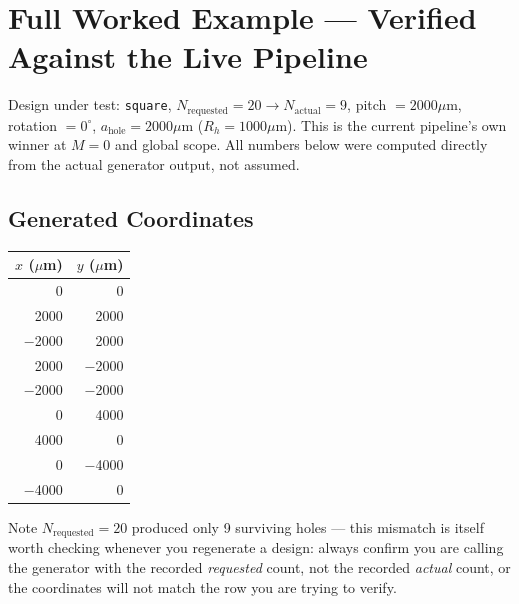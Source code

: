 \section{Full Worked Example --- Verified Against the Live Pipeline}

Design under test: \texttt{square}, $N_{\text{requested}}=20 \to
N_{\text{actual}}=9$, pitch $=2000\mu$m, rotation $=0^\circ$,
$a_{\text{hole}}=2000\mu$m ($R_h=1000\mu$m). This is the current pipeline's
own winner at $M{=}0$ and global scope. All numbers below were computed
directly from the actual generator output, not assumed.

\subsection{Generated Coordinates}
\begin{center}
\begin{tabular}{rr}
\toprule
$x$ ($\mu$m) & $y$ ($\mu$m) \\
\midrule
0 & 0 \\
2000 & 2000 \\
$-$2000 & 2000 \\
2000 & $-$2000 \\
$-$2000 & $-$2000 \\
0 & 4000 \\
4000 & 0 \\
0 & $-$4000 \\
$-$4000 & 0 \\
\bottomrule
\end{tabular}
\end{center}

Note $N_{\text{requested}}=20$ produced only 9 surviving holes --- this
mismatch is itself worth checking whenever you regenerate a design: always
confirm you are calling the generator with the recorded
\emph{requested} count, not the recorded \emph{actual} count, or the
coordinates will not match the row you are trying to verify.

\newpage

